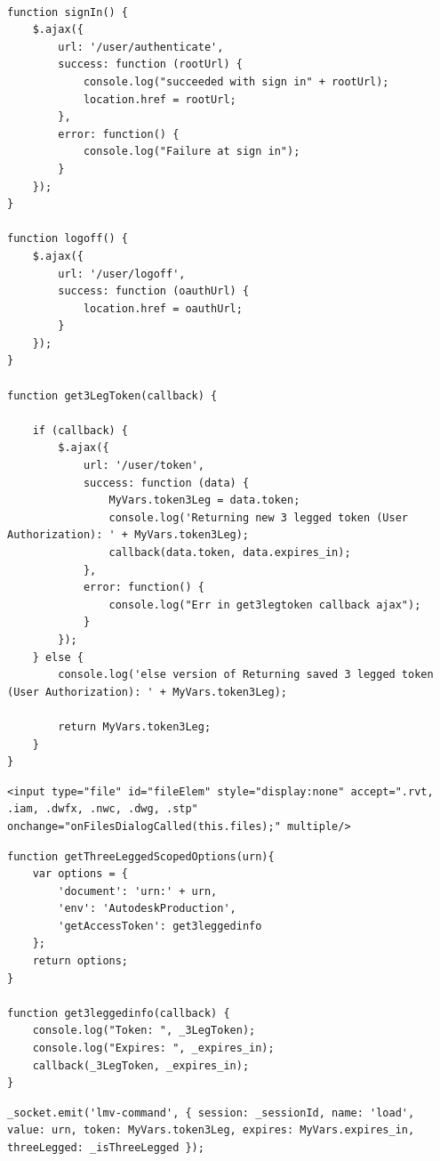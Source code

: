 \documentclass[10pt,draftclsnofoot,onecolumn]{IEEEtran}
\begin{document}
\begin{lstlisting}[caption=Login related functions]

function signIn() {
    $.ajax({
        url: '/user/authenticate',
        success: function (rootUrl) {
            console.log("succeeded with sign in" + rootUrl);
            location.href = rootUrl;
        },
        error: function() {
            console.log("Failure at sign in");
        }
    });
}

function logoff() {
    $.ajax({
        url: '/user/logoff',
        success: function (oauthUrl) {
            location.href = oauthUrl;
        }
    });
}

function get3LegToken(callback) {

    if (callback) {
        $.ajax({
            url: '/user/token',
            success: function (data) {
                MyVars.token3Leg = data.token;
                console.log('Returning new 3 legged token (User Authorization): ' + MyVars.token3Leg);
                callback(data.token, data.expires_in);
            },
            error: function() {
                console.log("Err in get3legtoken callback ajax");
            }
        });
    } else {
        console.log('else version of Returning saved 3 legged token (User Authorization): ' + MyVars.token3Leg);

        return MyVars.token3Leg;
    }
}

\end{lstlisting}
\begin{lstlisting}[caption=local file upload restriction]
<input type="file" id="fileElem" style="display:none" accept=".rvt, .iam, .dwfx, .nwc, .dwg, .stp" onchange="onFilesDialogCalled(this.files);" multiple/>
\end{lstlisting}
\begin{lstlisting}[caption=non-local file upload restriction]
function getThreeLeggedScopedOptions(urn){
    var options = {
        'document': 'urn:' + urn,
        'env': 'AutodeskProduction',
        'getAccessToken': get3leggedinfo
    };
    return options;   
}

function get3leggedinfo(callback) {
    console.log("Token: ", _3LegToken);
    console.log("Expires: ", _expires_in);
    callback(_3LegToken, _expires_in);
}
\end{lstlisting}
\begin{lstlisting}[caption=socket.io for passing three legged information]
_socket.emit('lmv-command', { session: _sessionId, name: 'load', value: urn, token: MyVars.token3Leg, expires: MyVars.expires_in, threeLegged: _isThreeLegged });
\end{lstlisting}
\end{document}

